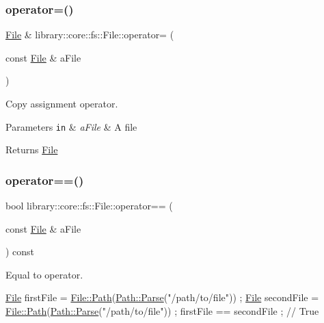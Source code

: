 \subsubsection{\texorpdfstring{operator=()}{operator=()}}
{\footnotesize\ttfamily \hyperlink{classlibrary_1_1core_1_1fs_1_1_file}{File} \& library\+::core\+::fs\+::\+File\+::operator= (\begin{DoxyParamCaption}\item[{const \hyperlink{classlibrary_1_1core_1_1fs_1_1_file}{File} \&}]{a\+File }\end{DoxyParamCaption})}



Copy assignment operator. 


\begin{DoxyParams}[1]{Parameters}
\mbox{\tt in}  & {\em a\+File} & A file \\
\hline
\end{DoxyParams}
\begin{DoxyReturn}{Returns}
\hyperlink{classlibrary_1_1core_1_1fs_1_1_file}{File} 
\end{DoxyReturn}
\mbox{\label{classlibrary_1_1core_1_1fs_1_1_file_a44ab79a23c5a129be298a026dbeec62f}} 
\subsubsection{\texorpdfstring{operator==()}{operator==()}}
{\footnotesize\ttfamily bool library\+::core\+::fs\+::\+File\+::operator== (\begin{DoxyParamCaption}\item[{const \hyperlink{classlibrary_1_1core_1_1fs_1_1_file}{File} \&}]{a\+File }\end{DoxyParamCaption}) const}



Equal to operator. 


\begin{DoxyCode}
\hyperlink{classlibrary_1_1core_1_1fs_1_1_file_a6f3f0d79545ac9984c6f49432f0c6c39}{File} firstFile = \hyperlink{classlibrary_1_1core_1_1fs_1_1_file_a72d6cdf8bb7e299889c6149e2b8a6cc7}{File::Path}(\hyperlink{classlibrary_1_1core_1_1fs_1_1_path_a6ba644b6609507e724c217bf2020f5ae}{Path::Parse}(\textcolor{stringliteral}{"/path/to/file"})) ;
\hyperlink{classlibrary_1_1core_1_1fs_1_1_file_a6f3f0d79545ac9984c6f49432f0c6c39}{File} secondFile = \hyperlink{classlibrary_1_1core_1_1fs_1_1_file_a72d6cdf8bb7e299889c6149e2b8a6cc7}{File::Path}(\hyperlink{classlibrary_1_1core_1_1fs_1_1_path_a6ba644b6609507e724c217bf2020f5ae}{Path::Parse}(\textcolor{stringliteral}{"/path/to/file"})) ;
firstFile == secondFile ; \textcolor{comment}{// True}
\end{DoxyCode}



